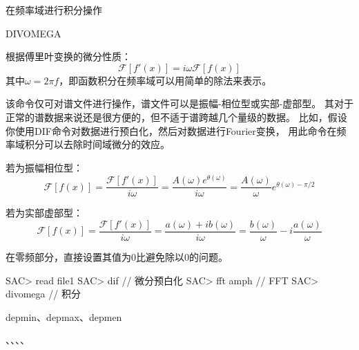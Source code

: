 \label{cmd:divomega}

在频率域进行积分操作

\begin{SACSTX}                                                                   
DIVOMEGA
\end{SACSTX}

根据傅里叶变换的微分性质：                                                       
\[                                                                               
\mathcal{F}[f'(x)]= i \omega \mathcal{F}[f(x)]                                   
\]                                                                               
其中$\omega = 2 \pi f $，即函数积分在频率域可以用简单的除法来表示。

该命令仅可对谱文件进行操作，谱文件可以是振幅-相位型或实部-虚部型。
其对于正常的谱数据来说还是很方便的，但不适于谱跨越几个量级的数据。
比如，假设你使用DIF命令对数据进行预白化，然后对数据进行Fourier变换，
用此命令在频率域积分可以去除时间域微分的效应。

若为振幅相位型：                                                                 
\[                                                                               
\mathcal{F}[f(x)] = \frac{\mathcal{F}[f'(x)]}{i \omega} 
                  = \frac{A(\omega)e^{\theta(\omega)}}{i \omega} 
                  = \frac{A(\omega)}{\omega}e^{\theta(\omega)-\pi/2}                                  
\]                                                                               
                                                                                 
若为实部虚部型：                                                                 
\[                                                                               
\mathcal{F}[f(x)] = \frac{\mathcal{F}[f'(x)]}{i \omega} 
                  = \frac{a(\omega)+ib(\omega)}{i \omega}
                  = \frac{b(\omega)}{\omega}-i\frac{a(\omega)}{\omega}
\] 

在零频部分，直接设置其值为0比避免除以0的问题。

\begin{SACCode}
SAC> read file1         
SAC> dif                // 微分预白化
SAC> fft amph           // FFT
SAC> divomega           // 积分
\end{SACCode}

depmin、depmax、depmen

、、、、
